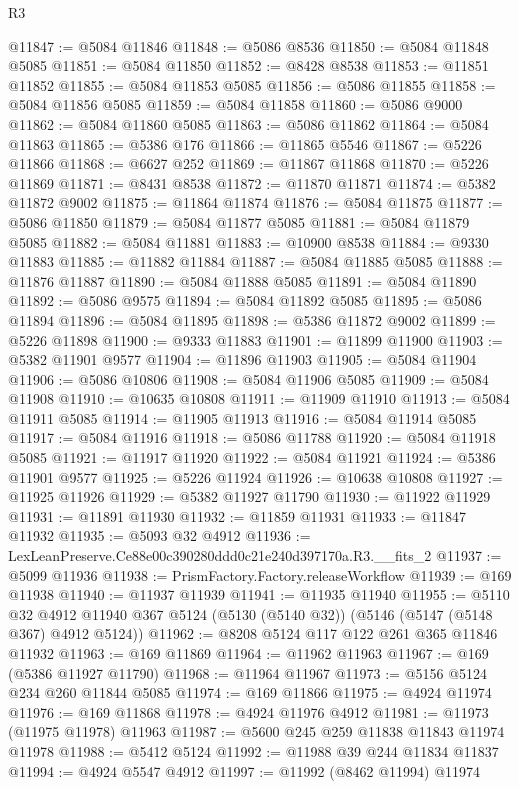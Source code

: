 \begin{lexlean}{R3}
\begin{coremodule}
@11847 := @5084 @11846
@11848 := @5086 @8536
@11850 := @5084 @11848 @5085
@11851 := @5084 @11850
@11852 := @8428 @8538
@11853 := @11851 @11852
@11855 := @5084 @11853 @5085
@11856 := @5086 @11855
@11858 := @5084 @11856 @5085
@11859 := @5084 @11858
@11860 := @5086 @9000
@11862 := @5084 @11860 @5085
@11863 := @5086 @11862
@11864 := @5084 @11863
@11865 := @5386 @176
@11866 := @11865 @5546
@11867 := @5226 @11866
@11868 := @6627 @252
@11869 := @11867 @11868
@11870 := @5226 @11869
@11871 := @8431 @8538
@11872 := @11870 @11871
@11874 := @5382 @11872 @9002
@11875 := @11864 @11874
@11876 := @5084 @11875
@11877 := @5086 @11850
@11879 := @5084 @11877 @5085
@11881 := @5084 @11879 @5085
@11882 := @5084 @11881
@11883 := @10900 @8538
@11884 := @9330 @11883
@11885 := @11882 @11884
@11887 := @5084 @11885 @5085
@11888 := @11876 @11887
@11890 := @5084 @11888 @5085
@11891 := @5084 @11890
@11892 := @5086 @9575
@11894 := @5084 @11892 @5085
@11895 := @5086 @11894
@11896 := @5084 @11895
@11898 := @5386 @11872 @9002
@11899 := @5226 @11898
@11900 := @9333 @11883
@11901 := @11899 @11900
@11903 := @5382 @11901 @9577
@11904 := @11896 @11903
@11905 := @5084 @11904
@11906 := @5086 @10806
@11908 := @5084 @11906 @5085
@11909 := @5084 @11908
@11910 := @10635 @10808
@11911 := @11909 @11910
@11913 := @5084 @11911 @5085
@11914 := @11905 @11913
@11916 := @5084 @11914 @5085
@11917 := @5084 @11916
@11918 := @5086 @11788
@11920 := @5084 @11918 @5085
@11921 := @11917 @11920
@11922 := @5084 @11921
@11924 := @5386 @11901 @9577
@11925 := @5226 @11924
@11926 := @10638 @10808
@11927 := @11925 @11926
@11929 := @5382 @11927 @11790
@11930 := @11922 @11929
@11931 := @11891 @11930
@11932 := @11859 @11931
@11933 := @11847 @11932
@11935 := @5093 @32 @4912
@11936 := LexLeanPreserve.Ce88e00c390280ddd0c21e240d397170a.R3.__fits_2
@11937 := @5099 @11936
@11938 := PrismFactory.Factory.releaseWorkflow
@11939 := @169 @11938
@11940 := @11937 @11939
@11941 := @11935 @11940
@11955 := @5110
    @32
    @4912
    @11940
    @367
    @5124
    (@5130 (@5140 @32))
    (@5146 (@5147 (@5148 @367) @4912 @5124))
@11962 := @8208 @5124 @117 @122 @261 @365 @11846 @11932
@11963 := @169 @11869
@11964 := @11962 @11963
@11967 := @169 (@5386 @11927 @11790)
@11968 := @11964 @11967
@11973 := @5156 @5124 @234 @260 @11844 @5085
@11974 := @169 @11866
@11975 := @4924 @11974
@11976 := @169 @11868
@11978 := @4924 @11976 @4912
@11981 := @11973 (@11975 @11978) @11963
@11987 := @5600 @245 @259 @11838 @11843 @11974 @11978
@11988 := @5412 @5124
@11992 := @11988 @39 @244 @11834 @11837
@11994 := @4924 @5547 @4912
@11997 := @11992 (@8462 @11994) @11974

\end{coremodule}
\end{lexlean}
